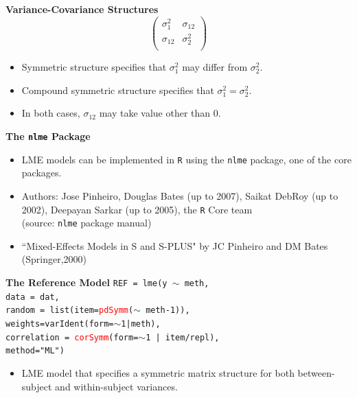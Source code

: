 \documentclass[compress]{beamer}        %
\makeatletter
\newcommand{\tcb}{\textcolor{beamer@blendedblue}}
\newcommand{\tcr}{\textcolor{red}}
\makeatother
\begin{document}
\begin{frame}{\bf \tcb{Variance-Covariance Structures}}
\[\left(
\begin{array}{cc}
\sigma^2_1 & \sigma_{12}\\
\sigma_{12} & \sigma^2_2\\
\end{array} \right)
\]

\begin{itemize}
\item Symmetric structure specifies that $\sigma^2_1$ may differ from $\sigma^2_2$.
\item Compound symmetric structure specifies that $\sigma^2_1 = \sigma^2_2$.
\item In both cases, $\sigma_{12}$ may take value other than 0.
\end{itemize}

\end{frame}
\begin{frame}{\bf \tcb{The \texttt{nlme} Package}}

\begin{itemize}
\item LME models can be implemented in \texttt{R} using the \texttt{nlme} package, one of the core packages.\\
\item Authors: Jose Pinheiro, Douglas Bates (up to 2007), Saikat
DebRoy (up to 2002), Deepayan Sarkar (up to 2005), the \texttt{R} Core team \\(source: \texttt{nlme} package manual)\\
\item ``Mixed-Effects Models in S and S-PLUS" by JC Pinheiro and DM Bates (Springer,2000)

\end{itemize}

\end{frame}
\begin{frame}[fragile]{\bf \tcb{The Reference Model}}
\texttt{REF = lme(y $\sim$ meth,\\
   \hspace{0.6cm} data = dat,\\
   \hspace{0.6cm} random = list(item=\tcr{pdSymm}($\sim$ meth-1)), \\
   \hspace{0.6cm} weights=varIdent(form=$\sim$1|meth),\\
   \hspace{0.6cm} correlation = \tcr{corSymm}(form=$\sim$1 | item/repl),\\
   \hspace{0.6cm} method="ML")}\\
\begin{itemize}
\item LME model that specifies a symmetric matrix structure for both between-subject and within-subject variances.
\end{itemize}

\end{frame}
\end{document}
